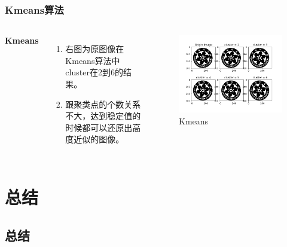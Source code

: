 \documentclass[UTF8,mathserif]{beamer}
\begin{document}
\begin{frame}
\frametitle{Kmeans算法}

\begin{columns}[c] %
	
	\textbf{Kmeans}
	\begin{enumerate}
		\item 右图为原图像在Kmeans算法中cluster在2到6的结果。
		\item 跟聚类点的个数关系不大，达到稳定值的时候都可以还原出高度近似的图像。
	\end{enumerate}
	
	\begin{figure}[h]%
		\centering  %
		\includegraphics[width=1.2\linewidth]{image/Analyse_Kmeans}  %
		\caption{Kmeans}  %
		\label{fig:mcmthesis-logo}   %
	\end{figure}
	
	
\end{columns}
\end{frame}


\section{总结}

\subsection{总结}
\end{document}
